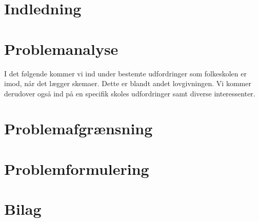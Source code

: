 \documentclass[12pt,hidelinks]{article}
\begin{document}
	\section{Indledning}
	
	\section{Problemanalyse}
	I det følgende kommer vi ind under bestemte udfordringer som folkeskolen er imod, når det lægger skemaer. Dette er blandt andet lovgivningen. Vi kommer derudover også ind på en specifik skoles udfordringer samt diverse interessenter.
	
	
	
	
	
	
	
	
	
	\section{Problemafgrænsning}
	
    \section{Problemformulering}
    
    \newpage
    
	
	

    \section{Bilag}
    
    
    \newpage
    
\end{document}
